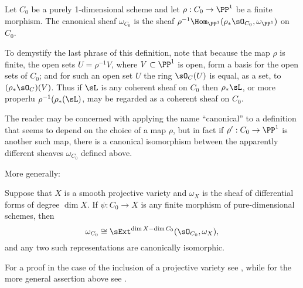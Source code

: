 \begin{definition}\label{canonical as Hom}
Let $C_0$ be a purely 1-dimensional scheme and let $\rho: C_0\to \PP^1$ be a finite morphism. The canonical sheaf $\omega_{C_0}$
is the sheaf $\rho^{-1}\Hom_{\PP^1}(\rho_*\sO_{C_0}, \omega_{\PP^1})$ on $C_0$. 
\end{definition}

To demystify the last phrase of this definition, note that because the map
$\rho$ is finite,  the open sets $U = \rho^{-1}V$, where $V\subset \PP^1$ is open, form a basis for the open sets of $C_0$; and for
such an open set $U$ the ring $\sO_C(U)$ is equal, as a set, to 
$(\rho_*\sO_C)(V)$. Thus if $\sL$ is any coherent sheaf on $C_0$ then $\rho_*\sL$, or more properlu $\rho^{-1}(\rho_*(\sL)$,
may be regarded as a coherent sheaf on $C_0$.

The reader may be concerned with applying the name ``canonical'' to a definition that seems to
depend on the choice of a map $\rho$, but in fact if $\rho': C_0 \to \PP^1$ is another such map,
there is a canonical isomorphism between the apparently different sheaves $\omega_{C_0}$ defined above.

More generally:

\begin{fact}
Suppose that $X$ is a smooth projective variety and $\omega_X$ is the sheaf of differential forms of degree $\dim X$.
If $\psi: C_0 \to X$ is any finite morphism of pure-dimensional schemes, then
$$
\omega_{C_0} \cong \sExt^{\dim X -\dim C_0}(\sO_{C_0}, \omega_X),
$$
and any two such representations are canonically isomorphic.
\end{fact}

For a proof in the case of the inclusion of a projective variety see \cite[Section III.7]{Hartshorne1977}, while for the more general assertion above see \cite{AltmanKleiman}. 

